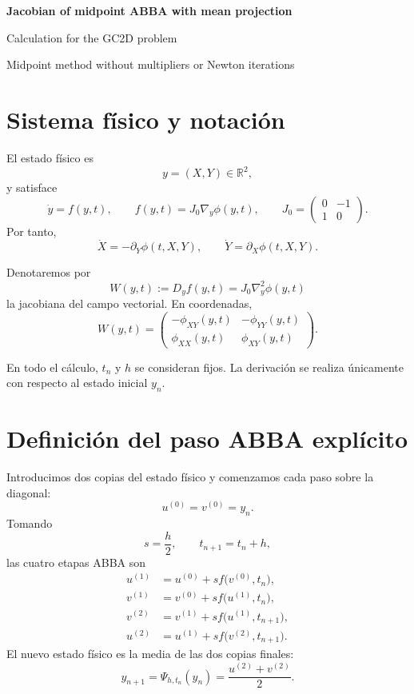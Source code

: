 \documentclass[11pt,a4paper]{article}
\newcommand{\R}{\mathbb{R}}
\begin{document}
\begin{center}
  {\LARGE\bfseries\color{azul}Jacobian of midpoint ABBA with mean projection}\par
  \vspace{0.35em}
  {\large Calculation for the GC2D problem}\par
  \vspace{0.4em}
  {\small Midpoint method without multipliers or Newton iterations}
\end{center}

\vspace{0.45em}

\section{Sistema físico y notación}

El estado físico es
\[
 y=(X,Y)\in\R^2,
\]
y satisface
\[
 \dot y=f(y,t),
 \qquad
 f(y,t)=J_0\nabla_y\phi(y,t),
 \qquad
 J_0=
 \begin{pmatrix}
  0&-1\\
  1&0
 \end{pmatrix}.
\]
Por tanto,
\[
 \dot X=-\partial_Y\phi(t,X,Y),
 \qquad
 \dot Y=\partial_X\phi(t,X,Y).
\]

Denotaremos por
\[
 W(y,t):=D_yf(y,t)=J_0\nabla_y^2\phi(y,t)
\]
la jacobiana del campo vectorial. En coordenadas,
\[
 \boxed{
 W(y,t)=
 \begin{pmatrix}
  -\phi_{XY}(y,t)&-\phi_{YY}(y,t)\\
  \phi_{XX}(y,t)&\phi_{XY}(y,t)
 \end{pmatrix}.}
 \tag{1}
\]

En todo el cálculo, \(t_n\) y \(h\) se consideran fijos. La derivación se realiza
únicamente con respecto al estado inicial \(y_n\).

\section{Definición del paso ABBA explícito}

Introducimos dos copias del estado físico y comenzamos cada paso sobre la diagonal:
\[
 u^{(0)}=v^{(0)}=y_n.
 \tag{2}
\]
Tomando
\[
 s=\frac h2,
 \qquad
 t_{n+1}=t_n+h,
\]
las cuatro etapas ABBA son
\begin{align}
 u^{(1)}
 &=u^{(0)}+s f\bigl(v^{(0)},t_n\bigr),
 \tag{3a}\\
 v^{(1)}
 &=v^{(0)}+s f\bigl(u^{(1)},t_n\bigr),
 \tag{3b}\\
 v^{(2)}
 &=v^{(1)}+s f\bigl(u^{(1)},t_{n+1}\bigr),
 \tag{3c}\\
 u^{(2)}
 &=u^{(1)}+s f\bigl(v^{(2)},t_{n+1}\bigr).
 \tag{3d}
\end{align}
El nuevo estado físico es la media de las dos copias finales:
\[
 \boxed{
 y_{n+1}=\Psi_{h,t_n}(y_n)
 =\frac{u^{(2)}+v^{(2)}}2.}
 \tag{4}
\]
\end{document}
